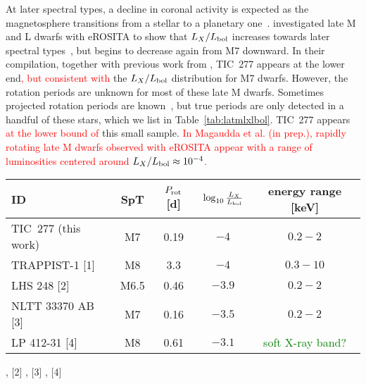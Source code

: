 \documentclass[twocolumn]{aastex631}
\begin{document}
At later spectral types, a decline in coronal activity is expected as the magnetosphere transitions from a stellar to a planetary one~\citep{pineda2017panchromatic}. \citet{stelzer2022first} investigated late M and L dwarfs with eROSITA to show that $L_X/L_{\rm bol}$ increases towards later spectral types~\citep{magaudda2022firsta}, but begins to decrease again from M7 downward. In their compilation, together with previous work from \citet{stelzer2012ultracool, cook2014trends, deluca2020extras, williams2014trends, berger2008simultaneous}, TIC~277 appears at the lower end\textcolor{red}{, but consistent with} the $L_X/L_{\rm bol}$ distribution for M7 dwarfs. However, the rotation periods are unknown for most of these late M dwarfs. Sometimes projected rotation periods are known~\citep{cook2014trends}, but true periods are only detected in a handful of these stars, which we list in Table~\ref{tab:latmlxlbol}. TIC~277 appears \textcolor{red}{at the lower bound of} this small sample. \textcolor{red}{In Magaudda et al. (in prep.), rapidly rotating late M dwarfs observed with eROSITA appear with a range of luminosities centered around $L_X/L_{\rm bol}\approx 10^{-4}$.} 

\begin{table*}[]
    \centering
    \caption{Late M dwarfs with known rotation period and X-ray luminosity.}
    \begin{tabular}{lcccc}
        ID & SpT &$P_{\rm rot}$ [d] & $\log_{10} \frac{L_X}{L_{\rm bol}} $ & energy range [keV]\\\hline
        TIC~277 (this work) & M7 & 0.19 & $-4$ & $0.2-2$ \\
        TRAPPIST-1 [1] & M8 & 3.3 & $-4$ & $0.3-10$\\
        LHS 248 [2] & M6.5 & 0.46 & $-3.9$ & $0.2-2$\\
        NLTT 33370 AB [3] & M7 & 0.16 & $-3.5$ & $0.2-2$ \\
        LP 412-31  [4] & M8 & 0.61 & $-3.1$& \textcolor{green}{soft X-ray band?}\\\hline
    \end{tabular}
     \footnotesize
     \vspace{0.1cm}\newline
    [1] \citet{brown2023coronal}, 
    [2] \citet{cook2014trends}, 
    [3] \citet{williams2015simultaneous}, 
    [4] \citet{stelzer2006simultaneous}    
    \label{tab:latmlxlbol}
\end{table*}
\end{document}
